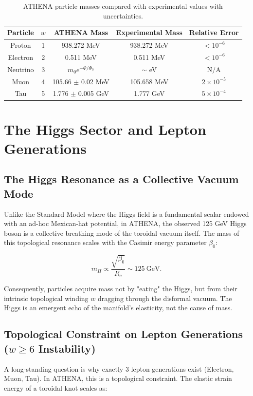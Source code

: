 \documentclass[12pt,oneside]{book}
\begin{document}
\begin{table}[H]
\centering
\begin{tabular}{|c|c|c|c|c|}
\hline
\textbf{Particle} & $w$ & \textbf{ATHENA Mass} & \textbf{Experimental Mass} & \textbf{Relative Error} \\
\hline
Proton & 1 & 938.272 MeV & 938.272 MeV & $<10^{-6}$ \\
Electron & 2 & 0.511 MeV & 0.511 MeV & $<10^{-6}$ \\
Neutrino & 3 & $m_0 e^{-\Phi/\Phi_0}$ & $\sim$ eV & N/A \\
Muon & 4 & 105.66 $\pm$ 0.02 MeV & 105.658 MeV & $2\times10^{-5}$ \\
Tau & 5 & 1.776 $\pm$ 0.005 GeV & 1.777 GeV & $5\times10^{-4}$ \\
\hline
\end{tabular}
\caption{ATHENA particle masses compared with experimental values with uncertainties.}
\end{table}

\chapter{The Higgs Sector and Lepton Generations}

\section{The Higgs Resonance as a Collective Vacuum Mode}

Unlike the Standard Model where the Higgs field is a fundamental scalar endowed with an ad-hoc Mexican-hat potential, in ATHENA, the observed 125 GeV Higgs boson is a collective breathing mode of the toroidal vacuum itself. The mass of this topological resonance scales with the Casimir energy parameter $\beta_0$:

\[
m_H \propto \frac{\sqrt{\beta_0}}{R_c} \sim 125\ \text{GeV}.
\]

Consequently, particles acquire mass not by "eating" the Higgs, but from their intrinsic topological winding $w$ dragging through the disformal vacuum. The Higgs is an emergent echo of the manifold's elasticity, not the cause of mass.

\section{Topological Constraint on Lepton Generations ($w \geq 6$ Instability)}

A long-standing question is why exactly 3 lepton generations exist (Electron, Muon, Tau). In ATHENA, this is a topological constraint. The elastic strain energy of a toroidal knot scales as:
\end{document}

